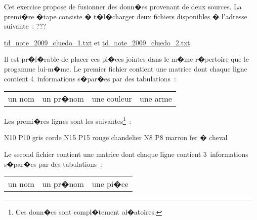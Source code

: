 %

\ifx\ifnotellipse\undefined
\newcommand{\ifnotellipse}[1]{}
\fi





\exosubject{}
\begin{xexercicenot}\label{td_note_rattrapage2009}%

Cet exercice propose de fusionner des donn�es provenant de deux sources. La premi�re �tape consiste � t�l�charger deux fichiers disponibles � l'adresse suivante~: ???

\begin{center}
\url{td\_note\_2009\_cluedo\_1.txt} et \url{td\_note\_2009\_cluedo\_2.txt}.
\end{center}

Il est pr�f�rable de placer ces pi�ces jointes dans le m�me r�pertoire que le progamme lui-m�me. Le premier fichier contient une matrice dont chaque ligne contient 4~informations s�par�es par des tabulations~:

\vspace{-0.15cm}
\begin{center}\begin{tabular}{llll}
un nom & un pr�nom & une couleur & une arme
\end{tabular}\end{center}
\vspace{-0.15cm}

Les premi�res lignes sont les suivantes\footnote{Ces donn�es sont compl�tement al�atoires.}~:
\vspace{-0.15cm}
\begin{verbatimx}
N10   P10   gris     corde
N15   P15   rouge    chandelier
N8    P8    marron   fer � cheval
\end{verbatimx}
\vspace{-0.15cm}

Le second fichier contient une matrice dont chaque ligne contient 3~informations s�par�es par des tabulations~:

\vspace{-0.15cm}
\begin{center}\begin{tabular}{lll}
un nom & un pr�nom & une pi�ce
\end{tabular}\end{center}
\vspace{-0.15cm}


\end{xexercicenot}
